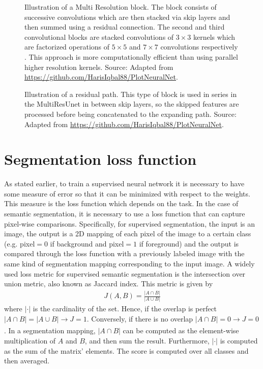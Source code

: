\begin{figure}
    \centering
    \resizebox{\linewidth}{!}{
    
    }
    \caption[Illustration of a Multi Resolution block]{Illustration of a Multi Resolution block. The block consists of successive convolutions which are then stacked via skip layers and then summed using a residual connection. The second and third convolutional blocks are stacked convolutions of $3\times3$ kernels which are factorized operations of $5\times 5$ and $7 \times7$ convolutions respectively \cite{conv-factor}. This approach is more computationally efficient than using parallel higher resolution kernels. Source: Adapted from \url{https://github.com/HarisIqbal88/PlotNeuralNet}.}
    \label{fig:multires}
\end{figure}

\begin{figure}
    \centering
    \resizebox{0.5\linewidth}{!}{
    
    }
    \caption[Illustration of a residual path]{Illustration of a residual path. This type of block is used in series in the MultiResUnet in between skip layers, so the skipped features are processed before being concatenated to the expanding path. Source: Adapted from \url{https://github.com/HarisIqbal88/PlotNeuralNet}.}
    \label{fig:respath}
\end{figure}

\clearpage
\section{Segmentation loss function}

As stated earlier, to train a supervised neural network it is necessary to have some measure of error so that it can be minimized with respect to the weights. This measure is the loss function which depends on the task. In the case of semantic segmentation, it is necessary to use a loss function that can capture pixel-wise comparisons. Specifically, for supervised segmentation, the input is an image, the output is a 2D mapping of each pixel of the image to a certain class (e.g. pixel$ = 0$ if background and pixel$ = 1$ if foreground) and the output is compared through the loss function with a previously labeled image with the same kind of segmentation mapping corresponding to the input image. A widely used loss metric for supervised semantic segmentation is the intersection over union metric, also known as Jaccard index. This metric is given by
\begin{align*}
    J(A, B) = \frac{|A\cap B|}{|A\cup B|}
\end{align*}
where $|\cdot|$ is the cardinality of the set. Hence, if the overlap is perfect $|A\cap B|=|A\cup B|\xrightarrow[]{} J=1$. Conversely, if there is no overlap $|A\cap B|=0\xrightarrow{} J=0$. In a segmentation mapping, $|A\cap B|$ can be computed as the element-wise multiplication of $A$ and $B$, and then sum the result. Furthermore, $|\cdot|$ is computed as the sum of the matrix' elements. The score is computed over all classes and then averaged.
    
